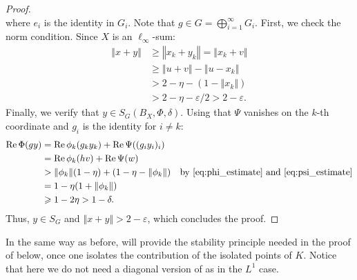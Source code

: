 \documentclass[a4paper,12pt]{amsart}
\theoremstyle{definition}
\theoremstyle{definition}
\theoremstyle{remark}
\numberwithin{equation}{section}
\DeclareMathOperator{\re}{Re}
\renewcommand{\geq}{\geqslant}
\newcommand{\<}{\langle}
\renewcommand{\>}{\rangle}
\newcommand{\norm}[1]{\left\Vert#1\right\Vert}
\newcommand{\e}{\varepsilon}
\newcommand{\eps}{\e}
\begin{document}
\begin{proof}
\begin{equation*}
		\end{equation*}
		where $e_i$ is the identity in $G_i$. Note that $g \in G = \bigoplus_{i=1}^\infty G_i$. First, we check the norm condition. Since $X$ is an $\ell_\infty$-sum:
		\begin{align*}
			\norm{x+y} &\geq \norm{x_k + y_k} = \norm{x_k + v} \\
			&\geq \norm{u+v} - \norm{u - x_k} \\
			&> 2 - \eta - (1 - \norm{x_k}) \\
			&> 2 - \eta - \eps/2 > 2 - \eps.
		\end{align*}
		Finally, we verify that $y \in S_G(B_X, \Phi, \delta)$. Using that $\Psi$ vanishes on the $k$-th coordinate and $g_i$ is the identity for $i \neq k$:
		\begin{align*}
			\re \Phi(gy) &= \re \phi_k(g_k y_k) + \re \Psi( (g_i y_i)_{i} ) \\
			&= \re \phi_k(hv) + \re \Psi(w) \\
			&> \|\phi_k\|(1-\eta) + (1 - \eta - \|\phi_k\|) \quad \text{by \eqref{eq:phi_estimate} and \eqref{eq:psi_estimate}} \\
			&= 1 - \eta(1 + \|\phi_k\|) \\
			&\geq 1 - 2\eta > 1 - \delta.
		\end{align*}
		Thus, $y \in S_G$ and $\norm{x+y} > 2-\eps$, which concludes the proof.
	\end{proof}
	
	
	
	In the same way as before,  will provide the stability principle needed in the proof of  below, once one isolates the contribution of the isolated points of $K$. Notice that here we do not need a diagonal version of   as in the $L^1$ case.
	
\end{document}
